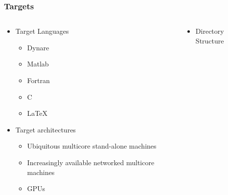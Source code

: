 \documentclass[tikz]{beamer}
\begin{document}
\begin{frame}
  \frametitle{Targets}
  \begin{columns}
    \begin{column}{.5\linewidth}
      

  \begin{itemize}
\item Target Languages
    \begin{itemize}
    \item Dynare
    \item Matlab
    \item Fortran
    \item C
    \item \LaTeX
    \end{itemize}
\item Target architectures
  \begin{itemize}
\item Ubiquitous multicore stand-alone machines
  \item Increasingly available networked multicore machines
  \item GPUs
  \end{itemize}


  \end{itemize}
\end{column}
    \begin{column}{.5\linewidth}

      \begin{itemize}
      \item Directory Structure
      \end{itemize}





\end{column}

  \end{columns}


\end{frame}

\end{document}

